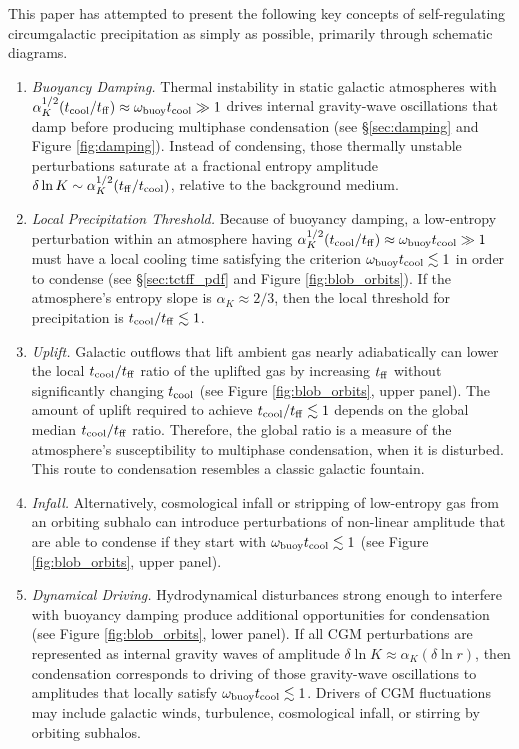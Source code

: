 \documentclass[twocolumn]{aastex63}
\begin{document}
This paper has attempted to present the following key concepts of self-regulating circumgalactic precipitation as simply as possible, primarily through schematic diagrams.
\begin{enumerate}

    \item \textit{Buoyancy Damping.}  Thermal instability in static galactic atmospheres with $\alpha_K^{1/2} (t_{\rm cool} / t_{\rm ff}) \approx \omega_{\rm buoy} t_{\rm cool} \gg 1$ drives internal gravity-wave oscillations that damp before producing multiphase condensation (see \S \ref{sec:damping} and Figure \ref{fig:damping}). Instead of condensing, those thermally unstable perturbations saturate at a fractional entropy amplitude $\delta \ln K \sim \alpha_K^{1/2} (t_{\rm ff}/t_{\rm cool})$, relative to the background medium.
    
    \item \textit{Local Precipitation Threshold.}  Because of buoyancy damping, a low-entropy perturbation within an atmosphere having $\alpha_K^{1/2} (t_{\rm cool} / t_{\rm ff}) \approx \omega_{\rm buoy} t_{\rm cool} \gg 1$ must have a local cooling time satisfying the criterion $\omega_{\rm buoy} t_{\rm cool} \lesssim 1$ in order to condense (see \S \ref{sec:tctff_pdf} and Figure \ref{fig:blob_orbits}).  If the atmosphere's entropy slope is $\alpha_K \approx 2/3$, then the local threshold for precipitation is $t_{\rm cool} / t_{\rm ff} \lesssim 1$.
    
    \item \textit{Uplift.}  Galactic outflows that lift ambient gas nearly adiabatically can lower the local $t_{\rm cool} / t_{\rm ff}$ ratio of the uplifted gas by increasing $t_{\rm ff}$ without significantly changing $t_{\rm cool}$ (see Figure \ref{fig:blob_orbits}, upper panel).  The amount of uplift required to achieve $t_{\rm cool} / t_{\rm ff} \lesssim 1$ depends on the global median $t_{\rm cool} / t_{\rm ff}$ ratio.  Therefore, the global ratio is a measure of the atmosphere's susceptibility to multiphase condensation, when it is disturbed.  This route to condensation resembles a classic galactic fountain.  
    
    \item \textit{Infall.} Alternatively, cosmological infall or stripping of low-entropy gas from an orbiting subhalo can introduce perturbations of non-linear amplitude that are able to condense if they start with $\omega_{\rm buoy} t_{\rm cool} \lesssim 1$ (see Figure \ref{fig:blob_orbits}, upper panel).  \item \textit{Dynamical Driving.}  Hydrodynamical disturbances strong enough to interfere with buoyancy damping produce additional opportunities for condensation (see Figure \ref{fig:blob_orbits}, lower panel).  If all CGM perturbations are represented as internal gravity waves of amplitude $\delta \ln K \approx \alpha_K (\delta \ln r)$, then condensation corresponds to driving of those gravity-wave oscillations to amplitudes that locally satisfy $\omega_{\rm buoy} t_{\rm cool} \lesssim 1$.  Drivers of CGM fluctuations may include galactic winds, turbulence, cosmological infall, or stirring by orbiting subhalos.
    

\end{enumerate}
\end{document}
